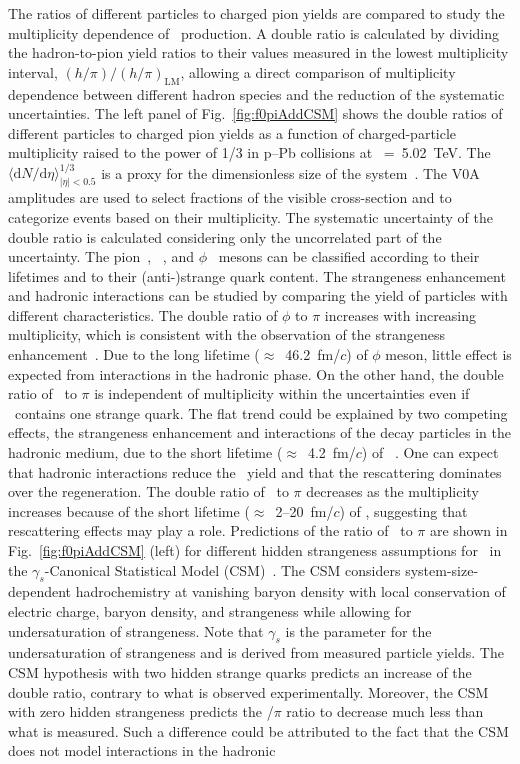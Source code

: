 The ratios of different particles to charged pion yields are compared to study the multiplicity dependence of \fzero~production. A double ratio is calculated by dividing the hadron-to-pion yield ratios to their values measured in the lowest multiplicity interval, $(h/\pi)/(h/\pi)_{\mathrm{LM}}$, allowing a direct comparison of multiplicity dependence between different hadron species and the reduction of the systematic uncertainties. The left panel of Fig.~\ref{fig:f0piAddCSM} shows the double ratios of different particles to charged pion yields as a function of charged-particle multiplicity raised to the power of 1/3 in p--Pb collisions at \snn~=~5.02~TeV. The $\langle \mathrm{d}N/\mathrm{d}\eta \rangle_{|\eta|<0.5}^{1/3}$ is a proxy for the dimensionless size of the system~\cite{Liu:2018xae}. The V0A amplitudes are used to select fractions of the visible cross-section and to categorize events based on their multiplicity. The systematic uncertainty of the double ratio is calculated considering only the uncorrelated part of the uncertainty. The pion~\cite{ALICE:2016dei}, \kstar~\cite{ALICE:2016sak}, and $\phi$~\cite{ALICE:2016sak} mesons can be classified according to their lifetimes and to their (anti-)strange quark content. The strangeness enhancement and hadronic interactions can be studied by comparing the yield of particles with different characteristics. The double ratio of $\phi$ to $\pi$ increases with increasing multiplicity, which is consistent with the observation of the strangeness enhancement~\cite{ALICE:2016fzo}. Due to the long lifetime ($\approx$~46.2~fm/$c$) of $\phi$ meson, little effect is expected from interactions in the hadronic phase. On the other hand, the double ratio of \kstar~to $\pi$ is independent of multiplicity within the uncertainties even if \kstar~contains one strange quark. The flat trend could be explained by two competing effects, the strangeness enhancement and interactions of the decay particles in the hadronic medium, due to the short lifetime ($\approx$~4.2~fm/$c$) of \kstar~\cite{ParticleDataGroup:2022pth}. One can expect that hadronic interactions reduce the \kstar~yield and that the rescattering dominates over the regeneration. The double ratio of \fzero~to $\pi$ decreases as the multiplicity increases because of the short lifetime ($\approx$~2--20~fm/$c$) of \fzero, suggesting that rescattering effects may play a role. Predictions of the ratio of \fzero~to $\pi$ are shown in Fig.~\ref{fig:f0piAddCSM} (left) for different hidden strangeness assumptions for \fzero~in the $\gamma_{s}$-Canonical Statistical Model (CSM)~\cite{Vovchenko:2019kes}. The CSM considers system-size-dependent hadrochemistry at vanishing baryon density with local conservation of electric charge, baryon density, and strangeness while allowing for undersaturation of strangeness. Note that $\gamma_{s}$ is the parameter for the undersaturation of strangeness and is derived from measured particle yields. The CSM hypothesis with two hidden strange quarks predicts an increase of the double ratio, contrary to what is observed experimentally. Moreover, the CSM with zero hidden strangeness predicts the \fzero/$\pi$ ratio to decrease much less than what is measured. Such a difference could be attributed to the fact that the CSM does not model interactions in the hadronic 
